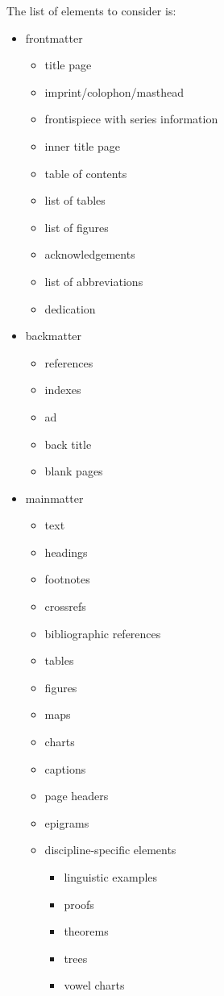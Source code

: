 \documentclass[guidelines,nonflat,modfonts] {langsci/langscibook}
\begin{document}
The list of elements to consider is:

\begin{itemize}
 \item frontmatter
 \begin{itemize}
  \item  title page
  \item  imprint/colophon/masthead
  \item  frontispiece with series information
  \item  inner title page 
  \item table of contents 
  \item list of tables 
  \item list of figures 
  \item acknowledgements 
  \item list of abbreviations 
  \item dedication
 \end{itemize} 
 \item backmatter
 \begin{itemize}
  \item  references
  \item  indexes
  \item  ad
  \item  back title
  \item  blank pages
 \end{itemize} 
 \item mainmatter
 \begin{itemize}
  \item  text
  \item  headings
  \item footnotes
  \item  crossrefs
  \item bibliographic references
  \item  tables
  \item  figures
  \item  maps
  \item  charts
  \item captions
  \item page headers 
  \item epigrams
  \item discipline-specific elements
  \begin{itemize}
   \item   linguistic examples
   \item   proofs
   \item   theorems
   \item   trees
   \item   vowel charts
  \end{itemize} 
 \end{itemize} 
\end{itemize}        
\end{document}
